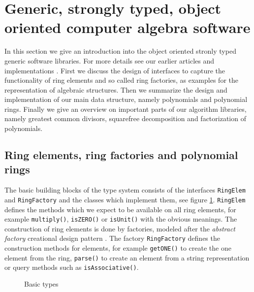 \documentclass{llncs}
\newcommand{\code}[1]{\texttt{#1}}
\begin{document}
\section{Generic, strongly typed, object oriented computer algebra software} %
\label{sec:asto}

In this section we give an introduction into the object oriented
stronly typed generic software libraries. For more details see our
earlier articles and implementations
\cite{JollyKredel:2009,JollyKredel:2010,Jolly:2010,Kredel:2011,Kredel:2008}. %
%
First we discuss the design of interfaces to capture the functionality
of ring elements and so called ring factories, as examples for the
representation of algebraic structures. Then we summarize the design
and implementation of our main data structure, namely polynomials and
polynomial rings. Finally we give an overview on important parts of
our algorithm libraries, namely greatest common divisors, squarefree
decomposition and factorization of polynomials.


\subsection{Ring elements, ring factories and polynomial rings} %
\label{sec:ring}

The basic building blocks of the type system consists of the
interfaces \code{RingElem} and \code{RingFactory} and the classes
which implement them, see figure \ref{fig:bastype}. \code{RingElem}
defines the methods which we expect to be available on all ring
elements, for example \code{multiply()},
\code{isZERO()} or \code{isUnit()} with the obvious meanings. The
construction of ring elements is done by factories, modeled after the
{\em abstract factory} creational design pattern \cite{Gamma:1995}.
The factory \code{RingFactory} defines the construction methods for
elements, for example \code{get\-ONE()} to create the one element from
the ring, 
\code{parse()} to create an element from a string representation or query methods such as
\code{is\-Asso\-ciative()}. %

\begin{figure}[thb]
\centering
{}
\caption{Basic types}
\label{fig:bastype}
\end{figure}
\end{document}
